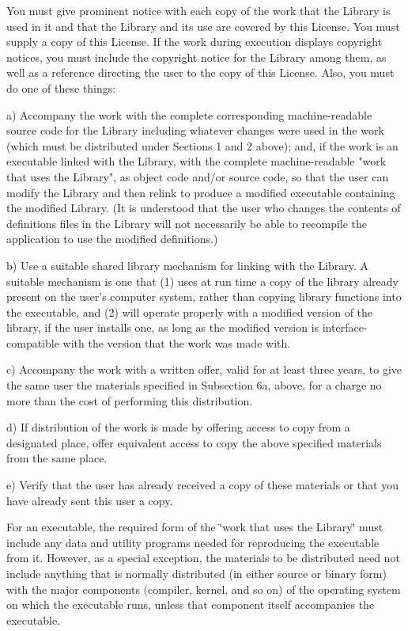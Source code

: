 You must give prominent notice with each copy of the work that the Library is used in it and that the Library and its use are covered by this License. You must supply a copy of this License. If the work during execution displays copyright notices, you must include the copyright notice for the Library among them, as well as a reference directing the user to the copy of this License. Also, you must do one of these things\-: \begin{DoxyVerb}a) Accompany the work with the complete corresponding
machine-readable source code for the Library including whatever
changes were used in the work (which must be distributed under
Sections 1 and 2 above); and, if the work is an executable linked
with the Library, with the complete machine-readable "work that
uses the Library", as object code and/or source code, so that the
user can modify the Library and then relink to produce a modified
executable containing the modified Library.  (It is understood
that the user who changes the contents of definitions files in the
Library will not necessarily be able to recompile the application
to use the modified definitions.)

b) Use a suitable shared library mechanism for linking with the
Library.  A suitable mechanism is one that (1) uses at run time a
copy of the library already present on the user's computer system,
rather than copying library functions into the executable, and (2)
will operate properly with a modified version of the library, if
the user installs one, as long as the modified version is
interface-compatible with the version that the work was made with.

c) Accompany the work with a written offer, valid for at
least three years, to give the same user the materials
specified in Subsection 6a, above, for a charge no more
than the cost of performing this distribution.

d) If distribution of the work is made by offering access to copy
from a designated place, offer equivalent access to copy the above
specified materials from the same place.

e) Verify that the user has already received a copy of these
materials or that you have already sent this user a copy.
\end{DoxyVerb}


For an executable, the required form of the \char`\"{}work that uses the
\-Library\char`\"{} must include any data and utility programs needed for reproducing the executable from it. However, as a special exception, the materials to be distributed need not include anything that is normally distributed (in either source or binary form) with the major components (compiler, kernel, and so on) of the operating system on which the executable runs, unless that component itself accompanies the executable.

